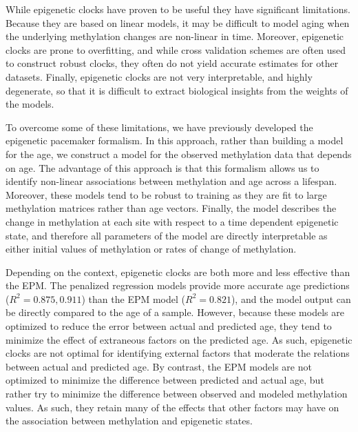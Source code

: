 \documentclass{article}
\begin{document}
{\begin{linenumbers}
While epigenetic clocks have proven to be useful they have significant limitations.  Because they are based on linear 
models, it may be difficult to model aging when the underlying methylation changes are non-linear in time.  Moreover, 
epigenetic clocks are prone to overfitting, and while cross validation schemes are often used to construct 
robust clocks, they often do not yield accurate estimates for other datasets.  Finally, epigenetic clocks are not 
very interpretable, and highly degenerate, so that it is difficult to extract biological insights from the weights 
of the models.

To overcome some of these limitations, we have previously developed the epigenetic pacemaker formalism.  In this 
approach, rather than building a model for the age, we construct a model for the observed methylation data that 
depends on age.  The advantage of this approach is that this formalism allows us to identify non-linear associations 
between methylation and age across a lifespan.  Moreover, these models tend to be robust to training as they are fit 
to large methylation matrices rather than age vectors. Finally, the model describes the change in methylation at each 
site with respect to a time dependent epigenetic state, and therefore all parameters of the model are directly 
interpretable as either initial values of methylation or rates of change of methylation.

Depending on the context, epigenetic clocks are both more and less effective than the EPM. The penalized regression 
models provide more accurate age predictions ($R^2=0.875,0.911$) than the EPM model ($R^2=0.821$), and the model 
output can be directly compared to the age of a sample. However, because these models are optimized to reduce the 
error between actual and predicted age, they tend to minimize the effect of extraneous factors on the predicted age.  
As such, epigenetic clocks are not optimal for identifying external factors that moderate the relations between actual 
and predicted age.  By contrast, the EPM models are not optimized to minimize the difference between predicted and 
actual age, but rather try to minimize the difference between observed and modeled methylation values.  As such, they 
retain many of the effects that other factors may have on the association between methylation and epigenetic states.  


\end{linenumbers}}
\end{document}

